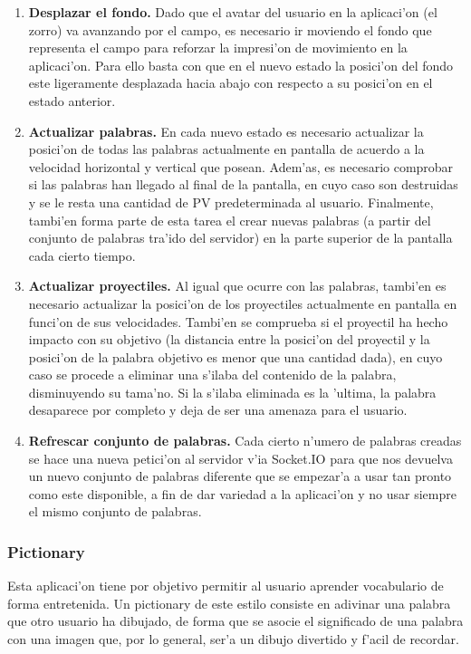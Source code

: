 \begin{itemize}
\begin{enumerate}
\item \textbf{Desplazar el fondo.} Dado que el avatar del usuario en la aplicaci'on (el zorro) va avanzando por el campo, es
necesario ir moviendo el fondo que representa el campo para reforzar la impresi'on de movimiento en la aplicaci'on.
Para ello basta con que en el nuevo estado la posici'on del fondo este ligeramente desplazada hacia abajo con
respecto a su posici'on en el estado anterior.
\item \textbf{Actualizar palabras.} En cada nuevo estado es necesario actualizar la posici'on de todas las palabras
actualmente en pantalla de acuerdo a la velocidad horizontal y vertical que posean.
Adem'as, es necesario comprobar si las palabras han llegado al final de la pantalla, en cuyo caso son destruidas y
se le resta una cantidad de PV predeterminada al usuario.
Finalmente, tambi'en forma parte de esta tarea el crear nuevas palabras (a partir del conjunto de palabras tra'ido
del servidor) en la parte superior de la pantalla cada cierto tiempo.
\item \textbf{Actualizar proyectiles.} Al igual que ocurre con las palabras, tambi'en es necesario actualizar la posici'on de
los proyectiles actualmente en pantalla en funci'on de sus velocidades.
Tambi'en se comprueba si el proyectil ha hecho impacto con su objetivo (la distancia entre la posici'on del proyectil
y la posici'on de la palabra objetivo es menor que una cantidad dada), en cuyo caso se procede a eliminar una s'ilaba
del contenido de la palabra, disminuyendo su tama'no. Si la s'ilaba eliminada es la 'ultima, la palabra desaparece
por completo y deja de ser una amenaza para el usuario.
\item \textbf{Refrescar conjunto de palabras.} Cada cierto n'umero de palabras creadas se hace una nueva petici'on al servidor
v'ia Socket.IO para que nos devuelva un nuevo conjunto de palabras diferente que se empezar'a a usar tan pronto como
este disponible, a fin de dar variedad a la aplicaci'on y no usar siempre el mismo conjunto de palabras.
\end{enumerate}
\end{itemize}

\subsubsection{Pictionary}
\label{sub:pictionary}

Esta aplicaci'on tiene por objetivo permitir al usuario aprender vocabulario de forma entretenida. Un pictionary de este estilo
consiste en adivinar una palabra que otro usuario ha dibujado, de forma que se asocie el significado de una palabra con una imagen
que, por lo general, ser'a un dibujo divertido y f'acil de recordar. 

